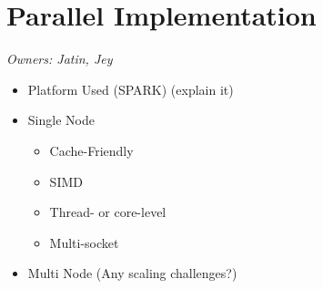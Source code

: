 \section{Parallel Implementation}
\textit{Owners: Jatin, Jey}
\begin{itemize}
  \item Platform Used (SPARK) (explain it)
  \item Single Node 
    \begin{itemize}
      \item Cache-Friendly 
      \item SIMD
      \item Thread- or core-level
      \item Multi-socket 
    \end{itemize}
  \item Multi Node (Any scaling challenges?)
\end{itemize}
